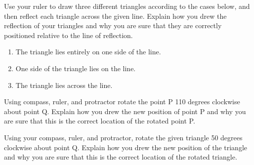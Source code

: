 \documentclass[nooutcomes]{ximera}
\begin{document}
\newpage
\begin{problem}
Use your ruler to draw three different triangles according to the cases below, and then reflect each triangle across the given line. Explain how you drew the reflection of your triangles and why you are sure that they are correctly positioned relative to the line of reflection.\\
\begin{enumerate}
    \item The triangle lies entirely on one side of the line.
    \item One side of the triangle lies on the line.
    \item The triangle lies across the line.
\end{enumerate}
\vskip 1in

\begin{center}
\end{center}


\vfill


\end{problem}
\newpage
\begin{problem}
Using compass, ruler, and protractor rotate the point P 110 degrees clockwise about point Q.  Explain how you drew the new position of point P and why you are sure that this is the correct location of the rotated point P.\\
\vfill

\begin{center}
\end{center}

\vfill
\end{problem}
\newpage

\begin{problem}
Using your compass, ruler, and protractor, rotate the given triangle 50 degrees clockwise about point Q.  Explain how you drew the new position of the triangle and why you are sure that this is the correct location of the rotated triangle.\\


\begin{center}
\end{center}
\vfill
\end{problem}
\newpage
\end{document}
